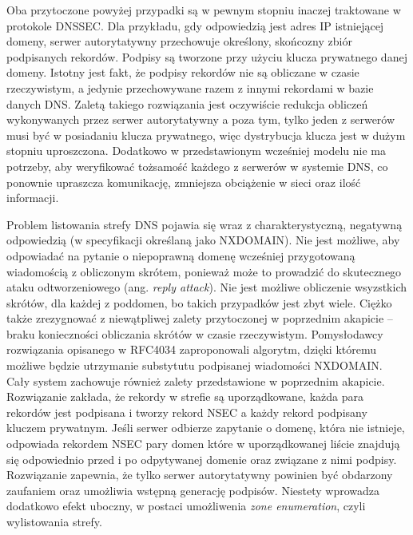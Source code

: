 Oba przytoczone powyżej przypadki są w pewnym stopniu inaczej traktowane w protokole DNSSEC. Dla przykładu, gdy odpowiedzią jest adres IP istniejącej domeny, serwer autorytatywny przechowuje określony, skońcozny zbiór podpisanych rekordów. Podpisy są tworzone przy użyciu klucza prywatnego danej domeny. Istotny jest fakt, że podpisy rekordów nie są obliczane w czasie rzeczywistym, a jedynie przechowywane razem z innymi rekordami w bazie danych DNS. Zaletą takiego rozwiązania jest oczywiście redukcja obliczeń wykonywanych przez serwer autorytatywny a poza tym, tylko jeden z serwerów musi być w posiadaniu klucza prywatnego, więc dystrybucja klucza jest w dużym stopniu uproszczona. Dodatkowo w przedstawionym wcześniej modelu nie ma potrzeby, aby weryfikować tożsamość każdego z serwerów w systemie DNS, co ponownie upraszcza komunikację, zmniejsza obciążenie w sieci oraz ilość informacji.

Problem listowania strefy DNS pojawia się wraz z charakterystyczną, negatywną odpowiedzią (w specyfikacji określaną jako NXDOMAIN). Nie jest możliwe, aby odpowiadać na pytanie o niepoprawną domenę wcześniej przygotowaną wiadomością z obliczonym skrótem, ponieważ może to prowadzić do skutecznego ataku odtworzeniowego (ang. \textit{reply attack}). Nie jest możliwe obliczenie wsyzstkich skrótów, dla każdej z poddomen, bo takich przypadków jest zbyt wiele. Ciężko także zrezygnować z niewątpliwej zalety przytoczonej w poprzednim akapicie -- braku konieczności obliczania skrótów w czasie rzeczywistym. Pomysłodawcy rozwiązania opisanego w RFC4034\cite{RFC4034} zaproponowali algorytm, dzięki któremu możliwe będzie utrzymanie substytutu podpisanej wiadomości NXDOMAIN. Cały system zachowuje również zalety przedstawione w poprzednim akapicie. Rozwiązanie zakłada, że rekordy w strefie są uporządkowane, każda para rekordów jest podpisana i tworzy rekord NSEC a każdy rekord podpisany kluczem prywatnym. Jeśli serwer odbierze zapytanie o domenę, która nie istnieje, odpowiada rekordem NSEC pary domen które w uporządkowanej liście znajdują się odpowiednio przed i po odpytywanej domenie oraz związane z nimi podpisy. Rozwiązanie zapewnia, że tylko serwer autorytatywny powinien być obdarzony zaufaniem oraz umożliwia wstępną generację podpisów. Niestety wprowadza dodatkowo efekt uboczny, w postaci umożliwenia \textit{zone enumeration}, czyli wylistowania strefy.

